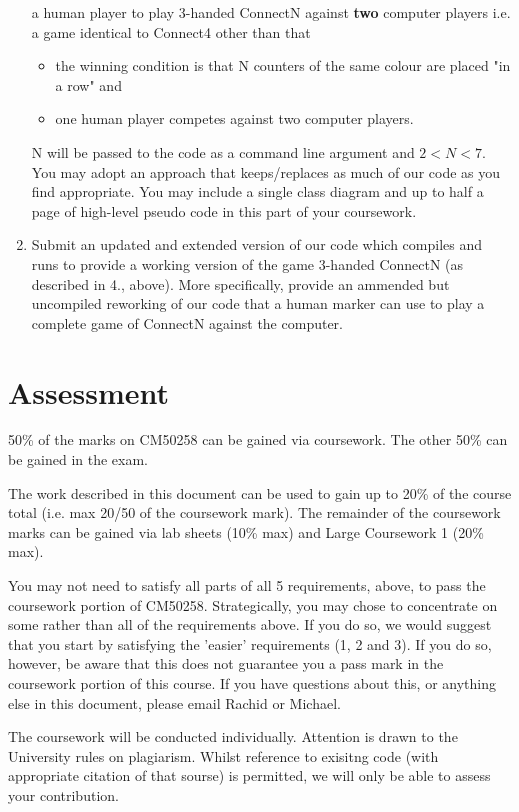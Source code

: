 \documentclass[12pt, oneside]{article}   	%
\begin{document}
\begin{enumerate}
a human player to play 3-handed ConnectN against \textbf{two} computer players 
i.e. a game identical to Connect4 other than that 
\begin{itemize}
\item the winning condition is that N counters of the same colour are placed "in a row" and 
\item one human player competes against two computer players.
\end{itemize}
N will be passed to 
the code as a command line argument and \(2<N<7\). You may adopt an 
approach that keeps/replaces as much of our code as you find appropriate. You may include a single class diagram and up to half a page of high-level pseudo code in this part of your coursework.
\item Submit an updated and extended version of our code which compiles and runs to provide a working 
version of the game 3-handed ConnectN (as described in 4., above). More specifically, provide an ammended but 
uncompiled reworking of our code that a human marker can use to play a complete game of 
ConnectN against the computer.
\end{enumerate}

\section{Assessment}
50\% of the marks on CM50258 can be gained via coursework. The other 50\% can be gained in 
the exam.

The work described in this document can be used to gain up to 20\% of the course total 
(i.e. max 20/50 of the coursework mark). The remainder of the coursework marks can be 
gained via lab sheets (10\% max) and Large Coursework 1 (20\% max). 

You may not need to satisfy all parts of all 5 requirements, above, to pass the coursework 
portion of CM50258. Strategically, you may chose to concentrate on some rather than all 
of the requirements above. If you do so, we would suggest that you start by satisfying the 
'easier' requirements (1, 2 and 3). If you do so, however, be aware that this does 
not guarantee you a pass mark in the coursework portion of this course. If you have 
questions about this, or anything else in this document, please email Rachid or Michael.

\bigskip

The coursework will be conducted individually. Attention is drawn to the University rules on plagiarism. Whilst reference to exisitng code (with appropriate citation of that sourse) is permitted, we will only be able to assess your contribution.
\end{document}
